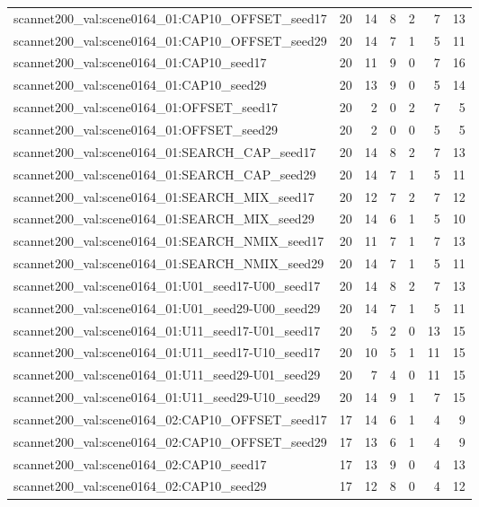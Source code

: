 \begin{table}[t]
\begin{tabular}{lrrrrrr}
scannet200\_val:scene0164\_01:CAP10\_OFFSET\_seed17 & 20 & 14 & 8 & 2 & 7 & 13 \\
scannet200\_val:scene0164\_01:CAP10\_OFFSET\_seed29 & 20 & 14 & 7 & 1 & 5 & 11 \\
scannet200\_val:scene0164\_01:CAP10\_seed17 & 20 & 11 & 9 & 0 & 7 & 16 \\
scannet200\_val:scene0164\_01:CAP10\_seed29 & 20 & 13 & 9 & 0 & 5 & 14 \\
scannet200\_val:scene0164\_01:OFFSET\_seed17 & 20 & 2 & 0 & 2 & 7 & 5 \\
scannet200\_val:scene0164\_01:OFFSET\_seed29 & 20 & 2 & 0 & 0 & 5 & 5 \\
scannet200\_val:scene0164\_01:SEARCH\_CAP\_seed17 & 20 & 14 & 8 & 2 & 7 & 13 \\
scannet200\_val:scene0164\_01:SEARCH\_CAP\_seed29 & 20 & 14 & 7 & 1 & 5 & 11 \\
scannet200\_val:scene0164\_01:SEARCH\_MIX\_seed17 & 20 & 12 & 7 & 2 & 7 & 12 \\
scannet200\_val:scene0164\_01:SEARCH\_MIX\_seed29 & 20 & 14 & 6 & 1 & 5 & 10 \\
scannet200\_val:scene0164\_01:SEARCH\_NMIX\_seed17 & 20 & 11 & 7 & 1 & 7 & 13 \\
scannet200\_val:scene0164\_01:SEARCH\_NMIX\_seed29 & 20 & 14 & 7 & 1 & 5 & 11 \\
scannet200\_val:scene0164\_01:U01\_seed17-U00\_seed17 & 20 & 14 & 8 & 2 & 7 & 13 \\
scannet200\_val:scene0164\_01:U01\_seed29-U00\_seed29 & 20 & 14 & 7 & 1 & 5 & 11 \\
scannet200\_val:scene0164\_01:U11\_seed17-U01\_seed17 & 20 & 5 & 2 & 0 & 13 & 15 \\
scannet200\_val:scene0164\_01:U11\_seed17-U10\_seed17 & 20 & 10 & 5 & 1 & 11 & 15 \\
scannet200\_val:scene0164\_01:U11\_seed29-U01\_seed29 & 20 & 7 & 4 & 0 & 11 & 15 \\
scannet200\_val:scene0164\_01:U11\_seed29-U10\_seed29 & 20 & 14 & 9 & 1 & 7 & 15 \\
scannet200\_val:scene0164\_02:CAP10\_OFFSET\_seed17 & 17 & 14 & 6 & 1 & 4 & 9 \\
scannet200\_val:scene0164\_02:CAP10\_OFFSET\_seed29 & 17 & 13 & 6 & 1 & 4 & 9 \\
scannet200\_val:scene0164\_02:CAP10\_seed17 & 17 & 13 & 9 & 0 & 4 & 13 \\
scannet200\_val:scene0164\_02:CAP10\_seed29 & 17 & 12 & 8 & 0 & 4 & 12 \\

\end{tabular}
\end{table}
